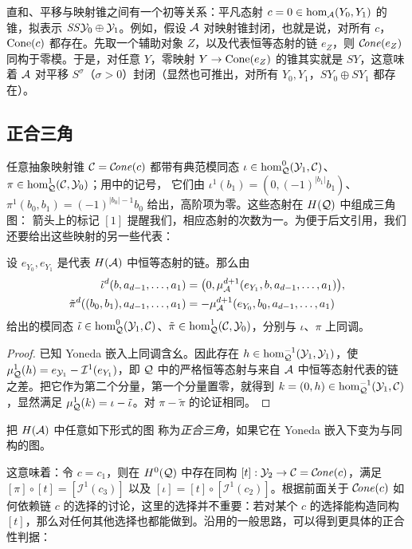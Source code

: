 \begin{note}\label{st:3.5}
直和、平移与映射锥之间有一个初等关系：平凡态射 $c=0\in\hom_{\mathcal A}(Y_0,Y_1)$ 的锥，拟表示 $\mathit{SS}\mathcal Y_0\oplus\mathcal Y_1$。例如，假设 $\mathcal A$ 对映射锥封闭，也就是说，对所有 $c$，$\operatorname{Cone}(c)$ 都存在。先取一个辅助对象 $Z$，以及代表恒等态射的链 $e_Z$，则 $\mathcal C\!\mathit{one}(e_Z)$ 同构于零模。于是，对任意 $Y$，零映射 $Y\to\operatorname{Cone}(e_Z)$ 的锥其实就是 $SY$，这意味着 $\mathcal A$ 对平移 $S^{\sigma}$（$\sigma>0$）封闭（显然也可推出，对所有 $Y_0,Y_1$，$SY_0\oplus SY_1$ 都存在）。
\end{note}

\subsection{正合三角}\label{sec:3f}
任意抽象映射锥 $\mathcal C=\mathcal C\!\mathit{one}(c)$ 都带有典范模同态 $\iota\in\hom^0_{\mathcal Q}(\mathcal Y_1,\mathcal C)$、$\pi\in\hom^1_{\mathcal Q}(\mathcal C,\mathcal Y_0)$；用中的记号，
它们由 $\iota^1(b_1)=(0,(-1)^{|b_1|}b_1)$、$\pi^1(b_0,b_1)=(-1)^{|b_0|-1}b_0$ 给出，高阶项为零。这些态射在 $H(\mathcal Q)$ 中组成三角图：
箭头上的标记 $[1]$ 提醒我们，相应态射的次数为一。为便于后文引用，我们还要给出这些映射的另一些代表：
\begin{lemma}\label{st:3.6}
设 $e_{Y_0},e_{Y_1}$ 是代表 $H(\mathcal A)$ 中恒等态射的链。那么由
\[
\begin{aligned}
\tilde\iota^d(b,a_{d-1},\ldots,a_1)&=\bigl(0,\mu^{d+1}_{\mathcal A}(e_{Y_1},b,a_{d-1},\ldots,a_1)\bigr),\\
\tilde\pi^d((b_0,b_1),a_{d-1},\ldots,a_1)&=-\mu^{d+1}_{\mathcal A}(e_{Y_0},b_0,a_{d-1},\ldots,a_1)
\end{aligned}
\]
给出的模同态 $\tilde\iota\in\hom^0_{\mathcal Q}(\mathcal Y_1,\mathcal C)$、$\tilde\pi\in\hom^1_{\mathcal Q}(\mathcal C,\mathcal Y_0)$，分别与 $\iota$、$\pi$ 上同调。
\end{lemma}
\begin{proof}
已知 Yoneda 嵌入上同调含幺。因此存在 $h\in\hom^{-1}_{\mathcal Q}(\mathcal Y_1,\mathcal Y_1)$，使 $\mu^1_{\mathcal Q}(h)=e_{\mathcal Y_1}-\mathcal I^1(e_{Y_1})$，即 $\mathcal Q$ 中的严格恒等态射与来自 $\mathcal A$ 中恒等态射代表的链之差。把它作为第二个分量，第一个分量置零，就得到 $k=(0,h)\in\hom^{-1}_{\mathcal Q}(\mathcal Y_1,\mathcal C)$，显然满足 $\mu^1_{\mathcal Q}(k)=\iota-\tilde\iota$。对 $\pi-\tilde\pi$ 的论证相同。
\end{proof}

\begin{definition*}
把 $H(\mathcal A)$ 中任意如下形式的图
称为\emph{正合三角}，如果它在 Yoneda 嵌入下变为与同构的图。
\end{definition*}
这意味着：令 $c=c_1$，则在 $H^0(\mathcal Q)$ 中存在同构 $[t]:\mathcal Y_2\to\mathcal C=\mathcal C\!\mathit{one}(c)$，满足 $[\pi]\circ[t]=[\mathcal I^1(c_3)]$ 以及 $[\iota]=[t]\circ[\mathcal I^1(c_2)]$。根据前面关于 $\mathcal C\!\mathit{one}(c)$ 如何依赖链 $c$ 的选择的讨论，这里的选择并不重要：若对某个 $c$ 的选择能构造同构 $[t]$，那么对任何其他选择也都能做到。沿用的一般思路，可以得到更具体的正合性判据：

